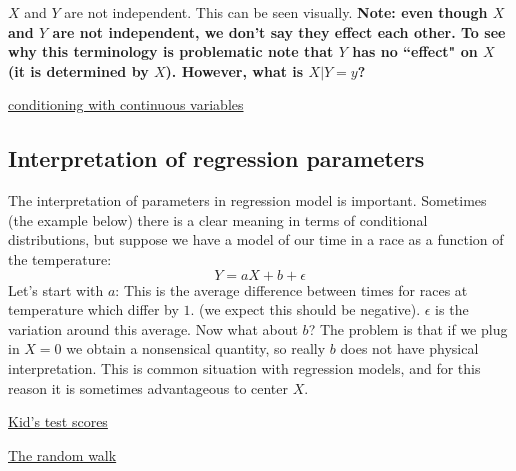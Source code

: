  $X$ and $Y$ are not independent. This can be seen visually.  {\bf Note: even though $X$ and $Y$ are not independent, we don't say they effect each other. To see why this terminology is problematic note that $Y$ has no ``effect" on $X$ (it is determined by $X$). However, what is $X|Y=y$?}
 

\begin{example}
\href{https://colab.research.google.com/drive/1PPFwE4GUzsr707s3mPhGRs7-TYlHxND2#scrollTo=LQe6xlfPbVJz&line=1&uniqifier=1}{conditioning with continuous variables}
\end{example}

\subsection{Interpretation of regression parameters}
The interpretation of parameters in regression model is important. Sometimes (the example below) there is a clear meaning in terms of conditional distributions, but suppose we have a model of our time in a race as a function of the temperature:  
\begin{equation}
Y = aX + b + \epsilon
\end{equation}
Let's start with $a$: This is the average difference between times for races at temperature which differ by $1$. (we expect this should be negative). $\epsilon$ is the variation around this average. Now what about $b$? The problem is that if we plug in $X=0$ we obtain a nonsensical quantity, so really $b$ does not have physical interpretation. This is common situation with regression models, and for this reason it is sometimes advantageous to center $X$. 



%

%

\begin{exercise}
\href{https://colab.research.google.com/drive/1PPFwE4GUzsr707s3mPhGRs7-TYlHxND2#scrollTo=3CXQuszHxsvn&line=19&uniqifier=1}{Kid's test scores}
\end{exercise}

\begin{exercise}
\href{https://colab.research.google.com/drive/1PPFwE4GUzsr707s3mPhGRs7-TYlHxND2#scrollTo=CGbybcoM8n6P&line=14&uniqifier=1}{The random walk}
\end{exercise}



